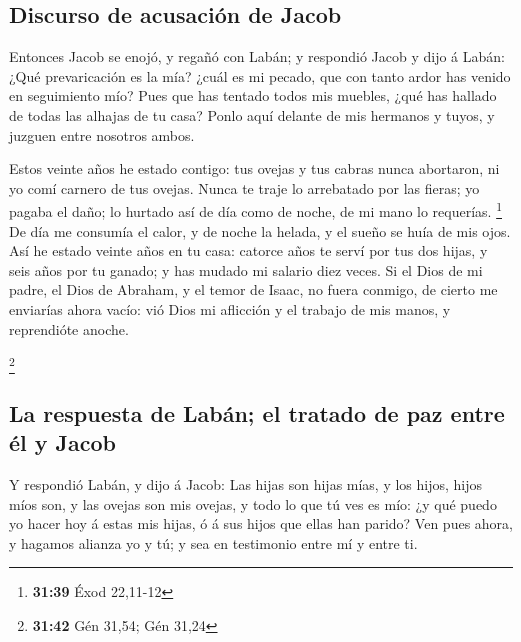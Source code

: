 \hypertarget{discurso-de-acusaciuxf3n-de-jacob}{%
\subsection{Discurso de acusación de
Jacob}\label{discurso-de-acusaciuxf3n-de-jacob}}

 Entonces Jacob se enojó, y regañó con Labán; y respondió
Jacob y dijo á Labán: ¿Qué prevaricación es la mía? ¿cuál es mi pecado,
que con tanto ardor has venido en seguimiento mío?  Pues
que has tentado todos mis muebles, ¿qué has hallado de todas las alhajas
de tu casa? Ponlo aquí delante de mis hermanos y tuyos, y juzguen entre
nosotros ambos.

 Estos veinte años he estado contigo: tus ovejas y tus
cabras nunca abortaron, ni yo comí carnero de tus ovejas.
 Nunca te traje lo arrebatado por las fieras; yo pagaba
el daño; lo hurtado así de día como de noche, de mi mano lo requerías.
\footnote{\textbf{31:39} Éxod 22,11-12}  De día me
consumía el calor, y de noche la helada, y el sueño se huía de mis ojos.
 Así he estado veinte años en tu casa: catorce años te
serví por tus dos hijas, y seis años por tu ganado; y has mudado mi
salario diez veces.  Si el Dios de mi padre, el Dios de
Abraham, y el temor de Isaac, no fuera conmigo, de cierto me enviarías
ahora vacío: vió Dios mi aflicción y el trabajo de mis manos, y
reprendióte anoche.

\footnote{\textbf{31:42} Gén 31,54; Gén 31,24}

\hypertarget{la-respuesta-de-labuxe1n-el-tratado-de-paz-entre-uxe9l-y-jacob}{%
\subsection{La respuesta de Labán; el tratado de paz entre él y
Jacob}\label{la-respuesta-de-labuxe1n-el-tratado-de-paz-entre-uxe9l-y-jacob}}

 Y respondió Labán, y dijo á Jacob: Las hijas son hijas
mías, y los hijos, hijos míos son, y las ovejas son mis ovejas, y todo
lo que tú ves es mío: ¿y qué puedo yo hacer hoy á estas mis hijas, ó á
sus hijos que ellas han parido?  Ven pues ahora, y
hagamos alianza yo y tú; y sea en testimonio entre mí y entre ti.

